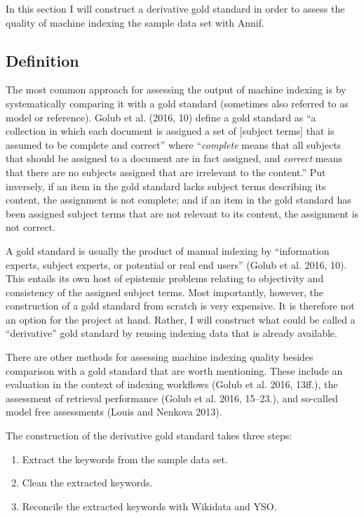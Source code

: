 In this section I will construct a derivative gold standard in order to
assess the quality of machine indexing the sample data set with Annif.

\hypertarget{definition}{%
\subsection{Definition}\label{definition}}

The most common approach for assessing the output of machine indexing is
by systematically comparing it with a gold standard (sometimes also
referred to as model or reference). Golub et al. (2016, 10) define a
gold standard as ``a collection in which each document is assigned a set
of {[}subject terms{]} that is assumed to be complete and correct''
where ``\emph{complete} means that all subjects that should be assigned
to a document are in fact assigned, and \emph{correct} means that there
are no subjects assigned that are irrelevant to the content.'' Put
inversely, if an item in the gold standard lacks subject terms
describing its content, the assignment is not complete; and if an item
in the gold standard has been assigned subject terms that are not
relevant to its content, the assignment is not correct.

A gold standard is usually the product of manual indexing by
``information experts, subject experts, or potential or real end users''
(Golub et al. 2016, 10). This entails its own host of epistemic problems
relating to objectivity and consistency of the assigned subject terms.
Most importantly, however, the construction of a gold standard from
scratch is very expensive. It is therefore not an option for the project
at hand. Rather, I will construct what could be called a ``derivative''
gold standard by reusing indexing data that is already available.

There are other methods for assessing machine indexing quality besides
comparison with a gold standard that are worth mentioning. These include
an evaluation in the context of indexing workflows (Golub et al. 2016,
13ff.), the assessment of retrieval performance (Golub et al. 2016,
15--23.), and so-called model free assessments (Louis and Nenkova 2013).

The construction of the derivative gold standard takes three steps:

\begin{enumerate}
\def\labelenumi{\arabic{enumi}.}
\tightlist
\item
  Extract the keywords from the sample data set.
\item
  Clean the extracted keywords.
\item
  Reconcile the extracted keywords with Wikidata and YSO.
\end{enumerate}

